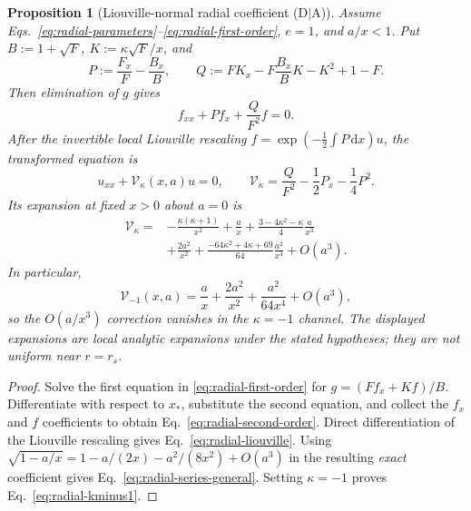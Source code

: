 \documentclass[11pt,a4paper]{article}
\newtheorem{proposition}[theorem]{Proposition}
\newcommand{\dd}{\mathrm d}
\begin{document}
\begin{proposition}[Liouville-normal radial coefficient (D$\mid$A)]
\label{prop:radial-test}
Assume Eqs.~\eqref{eq:radial-parameters}--\eqref{eq:radial-first-order},
$e=1$, and $a/x<1$. Put $B:=1+\sqrt F$, $K:=\kappa\sqrt F/x$, and
\begin{equation}\label{eq:radial-pq}
P:=\frac{F_x}{F}-\frac{B_x}{B},\qquad
Q:=F K_x-F\frac{B_x}{B}K-K^2+1-F.
\end{equation}
Then elimination of $g$ gives
\begin{equation}\label{eq:radial-second-order}
f_{xx}+P f_x+\frac Q{F^2}f=0.
\end{equation}
After the invertible local Liouville rescaling
$f=\exp(-\tfrac12\int P\,\dd x)u$, the transformed equation is
\begin{equation}\label{eq:radial-liouville}
\boxed{u_{xx}+\mathcal V_\kappa(x,a)u=0,\qquad
\mathcal V_\kappa=\frac Q{F^2}-\frac12P_x-\frac14P^2.}
\end{equation}
Its expansion at fixed $x>0$ about $a=0$ is
\begin{equation}\label{eq:radial-series-general}
\boxed{\begin{aligned}
\mathcal V_\kappa={}&-\frac{\kappa(\kappa+1)}{x^2}
+\frac ax+\frac{3-4\kappa^2-\kappa}{4}\frac a{x^3}\\
&+\frac{2a^2}{x^2}
+\frac{-64\kappa^2+4\kappa+69}{64}\frac{a^2}{x^4}
+O(a^3).
\end{aligned}}
\end{equation}
In particular,
\begin{equation}\label{eq:radial-kminus1}
\boxed{\mathcal V_{-1}(x,a)=\frac ax+\frac{2a^2}{x^2}
+\frac{a^2}{64x^4}+O(a^3),}
\end{equation}
so the $O(a/x^3)$ correction vanishes in the $\kappa=-1$
channel. The displayed expansions are local analytic expansions
under the stated hypotheses; they are not uniform near $r=r_s$.
\end{proposition}
\begin{proof}
Solve the first equation in \eqref{eq:radial-first-order} for
$g=(Ff_x+Kf)/B$. Differentiate with respect to $x_*$, substitute the
second equation, and collect the $f_x$ and $f$ coefficients to
obtain Eq.~\eqref{eq:radial-second-order}. Direct differentiation
of the Liouville rescaling gives Eq.~\eqref{eq:radial-liouville}.
Using $\sqrt{1-a/x}=1-a/(2x)-a^2/(8x^2)+O(a^3)$ in the resulting
\emph{exact} coefficient gives Eq.~\eqref{eq:radial-series-general}.
Setting $\kappa=-1$ proves Eq.~\eqref{eq:radial-kminus1}.
\end{proof}
\end{document}

